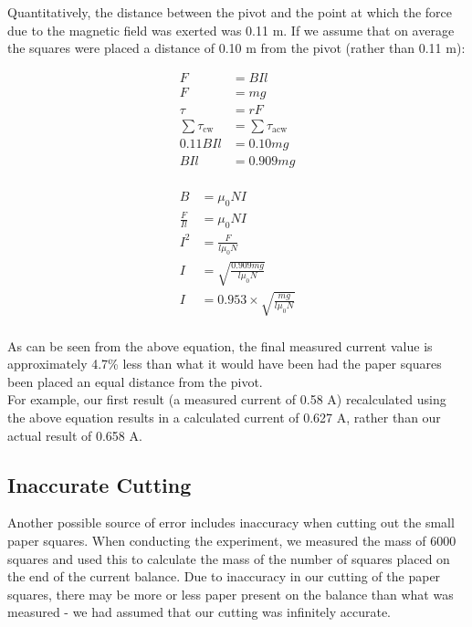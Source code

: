 \documentclass[a4paper,11pt]{article}
\begin{document}
Quantitatively, the distance between the pivot and the point at which the force
due to the magnetic field was exerted was 0.11 m. If we assume that on average
the squares were placed a distance of 0.10 m from the pivot (rather than 0.11
m):

$$
\begin{aligned}
F & = BIl \\
F & = mg \\
\tau & = r F \\
\sum \tau_{\mbox{cw}} & = \sum \tau_{\mbox{acw}} \\
0.11 B I l & = 0.10 m g \\
BIl & = 0.909 mg \\
\end{aligned}
$$

$$
\begin{aligned}
B & = \mu_0 NI \\
\frac{F}{Il} & = \mu_0 NI \\
I^2 & = \frac{F}{l \mu_0 N} \\
I & = \sqrt{\frac{0.909 mg}{l \mu_0 N}} \\
I & = 0.953 \times \sqrt{\frac{mg}{l \mu_0 N}} \\
\end{aligned}
$$

As can be seen from the above equation, the final measured current value is
approximately 4.7\% less than what it would have been had the paper squares been
placed an equal distance from the pivot. \\

For example, our first result (a measured current of 0.58 A) recalculated
using the above equation results in a calculated current of 0.627 A,
rather than our actual result of 0.658 A.


\subsection{Inaccurate Cutting}

Another possible source of error includes inaccuracy when cutting out the small
paper squares. When conducting the experiment, we measured the mass of 6000
squares and used this to calculate the mass of the number of squares placed on
the end of the current balance. Due to inaccuracy in our cutting of the paper
squares, there may be more or less paper present on the balance than what was
measured - we had assumed that our cutting was infinitely accurate. \\
\end{document}
